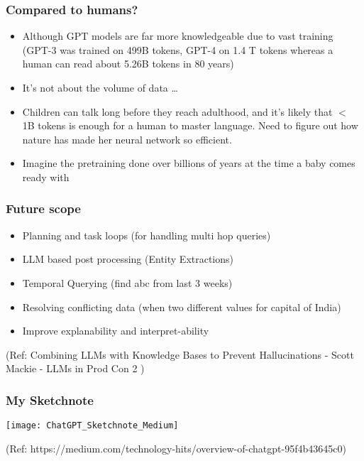\begin{frame}[fragile]\frametitle{Compared to humans?}


\begin{itemize}
\item Although GPT models are far more knowledgeable due to vast training (GPT-3 was trained on 499B tokens, GPT-4 on 1.4 T tokens whereas a human can read about 5.26B tokens in 80 years)
\item It's not about the volume of data \ldots
\item  Children can talk long before they reach adulthood, and it's likely that $<$ 1B tokens is enough for a human to master language. Need to figure out how nature has made her neural network so efficient.
\item Imagine the pretraining done over billions of years at the time a baby comes ready with
\end{itemize}	 

\end{frame}

\begin{frame}[fragile]\frametitle{Future scope}

\begin{itemize}
\item Planning and task loops (for handling multi hop queries)
\item LLM based post processing (Entity Extractions)
\item Temporal Querying (find abc from last 3 weeks)
\item Resolving conflicting data (when two different values for capital of India)
\item Improve explanability and interpret-ability
\end{itemize}	 

{\tiny (Ref: Combining LLMs with Knowledge Bases to Prevent Hallucinations - Scott Mackie - LLMs in Prod Con 2 )}

\end{frame}


\begin{frame}[fragile]\frametitle{My Sketchnote}

\begin{center}
\texttt{[image: ChatGPT\_Sketchnote\_Medium]}
\end{center}		

{\tiny (Ref: https://medium.com/technology-hits/overview-of-chatgpt-95f4b43645c0)}
			

\end{frame}


